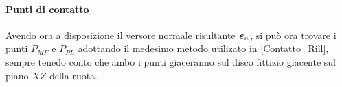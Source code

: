 \paragraph{Punti di contatto}
Avendo ora a disposizione il versore normale risultante $\textbf{\textit{e}}_n$, si può ora trovare i punti $P_{MF}$ e $P_{PL}$ adottando il medesimo metodo utilizato in \ref{Contatto_Rill}, sempre tenedo conto che ambo i punti giaceranno sul disco fittizio giacente sul piano $XZ$ della ruota. 

